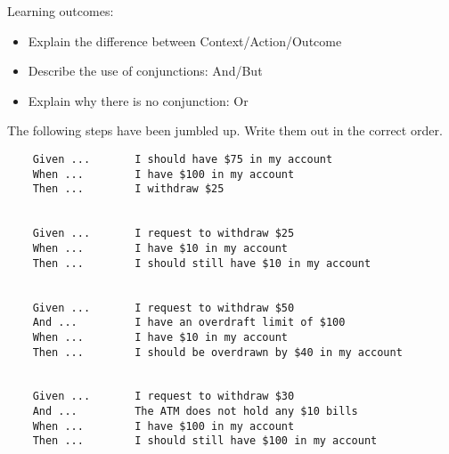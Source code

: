 \ifnotes

    Learning outcomes:
    
    \begin{itemize}
        \item Explain the difference between Context/Action/Outcome
        \item Describe the use of conjunctions: And/But
        \item Explain why there is no conjunction: Or 
    \end{itemize}

\fi 


\ifcontent
    The following steps have been jumbled up. Write them out in the correct order.

\begin{verbatim}
    Given ...       I should have $75 in my account
    When ...        I have $100 in my account
    Then ...        I withdraw $25
      

    Given ...       I request to withdraw $25
    When ...        I have $10 in my account
    Then ...        I should still have $10 in my account
    

    Given ...       I request to withdraw $50
    And ...         I have an overdraft limit of $100
    When ...        I have $10 in my account
    Then ...        I should be overdrawn by $40 in my account


    Given ...       I request to withdraw $30
    And ...         The ATM does not hold any $10 bills
    When ...        I have $100 in my account
    Then ...        I should still have $100 in my account  
    
    
\end{verbatim}


\fi